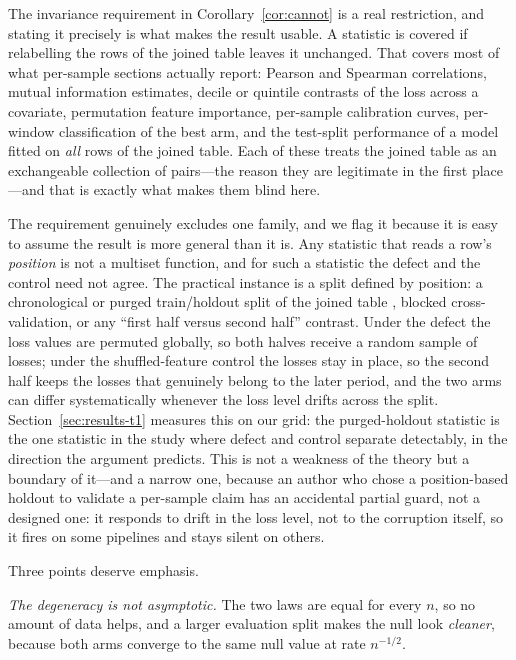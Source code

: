 \documentclass[a4paper,fleqn]{cas-sc}
\begin{document}
The invariance requirement in Corollary~\ref{cor:cannot} is a real restriction, and
stating it precisely is what makes the result usable. A statistic is covered if
relabelling the rows of the joined table leaves it unchanged. That covers most of
what per-sample sections actually report: Pearson and Spearman correlations,
mutual information estimates, decile or quintile contrasts of the loss across a
covariate, permutation feature importance, per-sample calibration curves,
per-window classification of the best arm, and the test-split performance of a
model fitted on \emph{all} rows of the joined table. Each of these treats the
joined table as an exchangeable collection of pairs---the reason they are
legitimate in the first place---and that is exactly what makes them blind here.

The requirement genuinely excludes one family, and we flag it because it is easy
to assume the result is more general than it is. Any statistic that reads a row's
\emph{position} is not a multiset function, and for such a statistic the defect and
the control need not agree. The practical instance is a split defined by position:
a chronological or purged train/holdout split of the joined table
\citep{bergmeir2012}, blocked cross-validation, or any ``first half versus second
half'' contrast. Under the defect the loss values are permuted globally, so both
halves receive a random sample of losses; under the shuffled-feature control the
losses stay in place, so the second half keeps the losses that genuinely belong to
the later period, and the two arms can differ systematically whenever the loss
level drifts across the split. Section~\ref{sec:results-t1} measures this on our
grid: the purged-holdout statistic is the one statistic in the study where defect
and control separate detectably, in the direction the argument predicts. This is
not a weakness of the theory but a boundary of it---and a narrow one, because an
author who chose a position-based holdout to validate a per-sample claim has an
accidental partial guard, not a designed one: it responds to drift in the loss
level, not to the corruption itself, so it fires on some pipelines and stays silent
on others.

Three points deserve emphasis.

\emph{The degeneracy is not asymptotic.} The two laws are equal for every $n$, so
no amount of data helps, and a larger evaluation split makes the null look
\emph{cleaner}, because both arms converge to the same null value at rate
$n^{-1/2}$.
\end{document}
